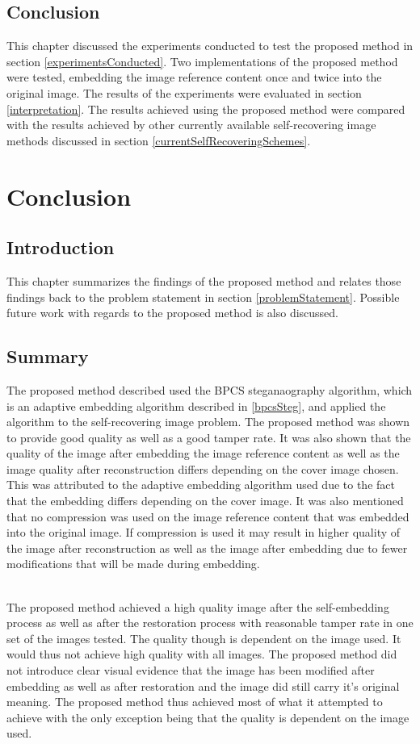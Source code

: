 \documentclass[12pt]{article}
\begin{document}
\subsection{Conclusion}
This chapter discussed the experiments conducted to test the proposed method in section \ref{experimentsConducted}.
Two implementations of the proposed method were tested, embedding the image reference content once and twice into the original image.
The results of the experiments were evaluated in section \ref{interpretation}.
The results achieved using the proposed method were compared with the results achieved by other currently available self-recovering image methods discussed in section \ref{currentSelfRecoveringSchemes}.  

\section{Conclusion}
\subsection{Introduction}
This chapter summarizes the findings of the proposed method and relates those findings back to the problem statement in section \ref{problemStatement}.
Possible future work with regards to the proposed method is also discussed.

\subsection{Summary}
The proposed method described used the BPCS steganaography algorithm, which is an adaptive embedding algorithm described in \ref{bpcsSteg}, and applied the algorithm to the self-recovering image problem.
The proposed method was shown to provide good quality as well as a good tamper rate.
It was also shown that the quality of the image after embedding the image reference content as well as the image quality after reconstruction differs depending on the cover image chosen.
This was attributed to the adaptive embedding algorithm used due to the fact that the embedding differs depending on the cover image.
It was also mentioned that no compression was used on the image reference content that was embedded into the original image.
If compression is used it may result in higher quality of the image after reconstruction as well as the image after embedding due to fewer modifications that will be made during embedding.

\hspace{0pt} \\
The proposed method achieved a high quality image after the self-embedding process as well as after the restoration process with reasonable tamper rate in one set of the images tested. The quality though is dependent on the image used. 
It would thus not achieve high quality with all images.
The proposed method did not introduce clear visual evidence that the image has been modified after embedding as well as after restoration and the image did still carry it's original meaning.
The proposed method thus achieved most of what it attempted to achieve with the only exception being that the quality is dependent on the image used.
 
\end{document}
